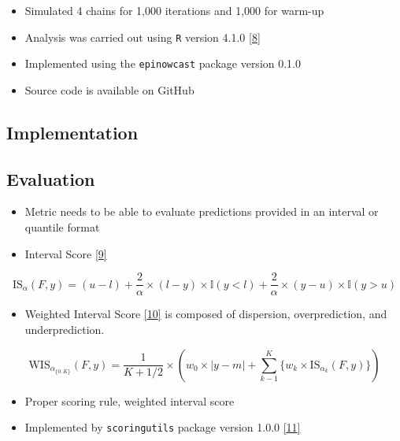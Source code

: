 \documentclass[
  a4paper,
]{article}
\providecommand{\tightlist}{%
  \setlength{\itemsep}{0pt}\setlength{\parskip}{0pt}}\usepackage{longtable,booktabs,array}
\begin{document}
\begin{itemize}
\tightlist
\item
  Simulated 4 chains for 1,000 iterations and 1,000 for warm-up
\item
  Analysis was carried out using \texttt{R} version 4.1.0
  \protect\hyperlink{ref-rcoreteam2022}{{[}8{]}}
\item
  Implemented using the \texttt{epinowcast} package version 0.1.0
\item
  Source code is available on GitHub
\end{itemize}

\hypertarget{implementation}{%
\subsection{Implementation}\label{implementation}}

\hypertarget{evaluation}{%
\subsection{Evaluation}\label{evaluation}}

\begin{itemize}
\tightlist
\item
  Metric needs to be able to evaluate predictions provided in an
  interval or quantile format
\item
  Interval Score \protect\hyperlink{ref-gneiting2007}{{[}9{]}}
\end{itemize}

\[\text{IS}_\alpha(F,y) = (u-l)+\frac{2}{\alpha}\times (l-y)\times \mathbb{I}(y<l) + \frac{2}{\alpha}\times(y-u)\times\mathbb{I}(y>u)\]

\begin{itemize}
\tightlist
\item
  Weighted Interval Score \protect\hyperlink{ref-bracher2021}{{[}10{]}}
  is composed of dispersion, overprediction, and underprediction.
\end{itemize}

\[\text{WIS}_{\alpha_{\{0:K\}}}(F,y)=\frac{1}{K+1/2}\times\left(w_0\times |y-m| + \sum_{k-1}^K\{w_k\times\text{IS}_{\alpha_k}(F,y)\}\right)\]

\begin{itemize}
\tightlist
\item
  Proper scoring rule, weighted interval score
\item
  Implemented by \texttt{scoringutils} package version 1.0.0
  \protect\hyperlink{ref-bosse}{{[}11{]}}
\end{itemize}
\end{document}
